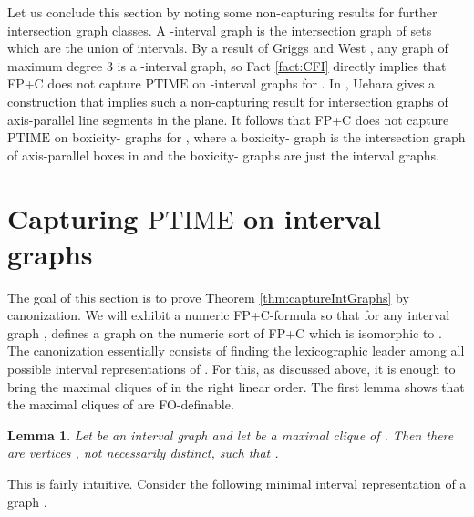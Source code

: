\documentclass[10pt]{article}
\newtheorem{lem}[thm]{Lemma}
\theoremstyle{remark}
\theoremstyle{definition}
\theoremstyle{plain}
\newcommand{\logic}[1]{\textsf{\upshape\relsize{-0.5}#1}\xspace}
\newcommand{\FPC}{\logic{FP+C}}
\newcommand{\FOL}{\logic{FO}}
\newcommand{\cclass}[1]{\ensuremath{\mathrm{#1}}\xspace}
\newcommand{\PTIME}{\cclass{PTIME}}
\begin{document}
Let us conclude this section by noting some non-capturing results for further intersection graph classes. A -interval graph is the intersection graph of sets which are the union of  intervals. By a result of Griggs and West \cite{griggs79extremal}, any graph of maximum degree 3 is a -interval graph, so Fact \ref{fact:CFI} directly implies that \FPC does not capture \PTIME on -interval graphs for . In \cite{Uehara08simple}, Uehara gives a construction that implies such a non-capturing result for intersection graphs of axis-parallel line segments in the plane. It follows that \FPC does not capture \PTIME on boxicity- graphs for , where a boxicity- graph is the intersection graph of axis-parallel boxes in  and the boxicity- graphs are just the interval graphs.







\section{Capturing \PTIME on interval graphs}\label{sec:CapOnIntGraphs}

The goal of this section is to prove Theorem \ref{thm:captureIntGraphs} by canonization. We will exhibit a numeric \FPC-formula  so that for any interval graph ,  defines a graph on the numeric sort of \FPC which is isomorphic to . The canonization essentially consists of finding the lexicographic leader among all possible interval representations of . For this, as discussed above, it is enough to bring the maximal cliques of  in the right linear order. The first lemma shows that the maximal cliques of  are \FOL-definable.

\begin{lem} \label{lem:maxCliquesDefable}
Let  be an interval graph and let  be a maximal clique of . Then there are vertices , not necessarily distinct, such that .
\end{lem}

This is fairly intuitive. Consider the following minimal interval representation of a graph .

\begin{center}
\end{center}
\end{document}

